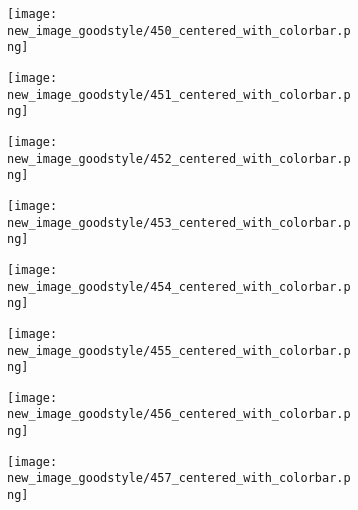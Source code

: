 \documentclass[a4paper,12pt]{article}
\begin{document}
\begin{figure}[H]
  \begin{subfigure}{0.11\textwidth}
    \texttt{[image: new\_image\_goodstyle/450\_centered\_with\_colorbar.png]}
  \end{subfigure}
  \hfill
  \begin{subfigure}{0.11\textwidth}
    \texttt{[image: new\_image\_goodstyle/451\_centered\_with\_colorbar.png]}
  \end{subfigure}
  \hfill
  \begin{subfigure}{0.11\textwidth}
    \texttt{[image: new\_image\_goodstyle/452\_centered\_with\_colorbar.png]}
  \end{subfigure}
  \hfill
  \begin{subfigure}{0.11\textwidth}
    \texttt{[image: new\_image\_goodstyle/453\_centered\_with\_colorbar.png]}
  \end{subfigure}
  \hfill
  \begin{subfigure}{0.11\textwidth}
    \texttt{[image: new\_image\_goodstyle/454\_centered\_with\_colorbar.png]}
  \end{subfigure}
  \hfill
  \begin{subfigure}{0.11\textwidth}
    \texttt{[image: new\_image\_goodstyle/455\_centered\_with\_colorbar.png]}
  \end{subfigure}
  \hfill
  \begin{subfigure}{0.11\textwidth}
    \texttt{[image: new\_image\_goodstyle/456\_centered\_with\_colorbar.png]}
  \end{subfigure}
  \hfill
  \begin{subfigure}{0.11\textwidth}
    \texttt{[image: new\_image\_goodstyle/457\_centered\_with\_colorbar.png]}
  \end{subfigure}
  \hfill
\end{figure}
\end{document}
